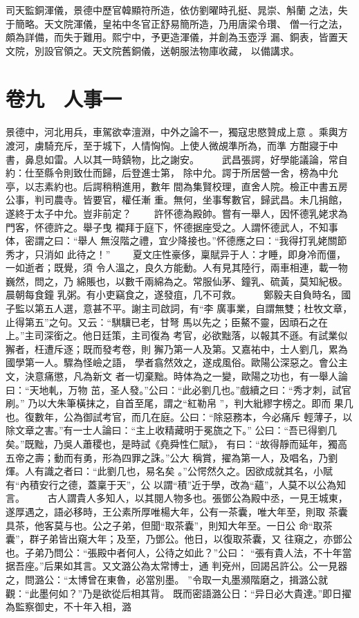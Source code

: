 \documentclass{ctexart}
\begin{document}
司天監銅渾儀，景德中歷官韓顯符所造，依仿劉曜時孔挺、晁崇、斛蘭 之法，失于簡略。天文院渾儀，皇祐中冬官正舒易簡所造，乃用唐梁令瓚、 僧一行之法，頗為詳備，而失于難用。熙宁中，予更造渾儀，并創為玉壺浮 漏、銅表，皆置天文院，別設官領之。天文院舊銅儀，送朝服法物庫收藏， 以備講求。
\clearpage
\section{卷九　人事一}
\paragraph{}
景德中，河北用兵，車駕欲幸澶淵，中外之論不一，獨寇忠愍贊成上意 。乘輿方渡河，虜騎充斥，至于城下，人情恟恟。上使人微覘準所為，而準 方酣寢于中書，鼻息如雷。人以其一時鎮物，比之謝安。 　　武昌張諤，好學能議論，常自約：仕至縣令則致仕而歸，后登進士第， 除中允。諤于所居營一舍，榜為中允亭，以志素約也。后諤稍稍進用，數年 間為集賢校理，直舍人院。檢正中書五房公事，判司農寺。皆要官，權任漸 重。無何，坐事奪數官，歸武昌。未几捐館，遂終于太子中允。豈非前定？ 　　許怀德為殿帥。嘗有一舉人，因怀德乳姥求為門客，怀德許之。舉子曳 襴拜于庭下，怀德据座受之。人謂怀德武人，不知事体，密謂之曰：``舉人 無沒階之禮，宜少降接也。''怀德應之曰：``我得打乳姥關節秀才，只消如 此待之！'' 　　夏文庄性豪侈，稟賦异于人：才睡，即身冷而僵，一如逝者；既覺，須 令人溫之，良久方能動。人有見其陸行，兩車相連，載一物巍然，問之，乃 綿賬也，以數千兩綿為之。常服仙茅、鐘乳、硫黃，莫知紀极。晨朝每食鐘 乳粥。有小吏竊食之，遂發疽，几不可救。 　　鄭毅夫自負時名，國子監以第五人選，意甚不平。謝主司啟詞，有``李 廣事業，自謂無雙；杜牧文章，止得第五''之句。又云：``騏驥已老，甘弩 馬以先之；臣鰲不靈，因頑石之在上。''主司深銜之。他日廷策，主司復為 考官，必欲黜落，以報其不遜。有試業似獬者，枉遭斥逐；既而發考卷，則 獬乃第一人及第。又嘉祐中，士人劉几，累為國學第一人。驟為怪嶮之語， 學者翕然效之，遂成風俗。歐陽公深惡之。會公主文，決意痛懲，凡為新文 者一切棄黜。時体為之一變，歐陽之功也，有一舉人論曰：``天地軋，万物 茁，圣人發。''公曰：``此必劉几也。''戲續之曰：``秀才刺，試官刷。'' 乃以大朱筆橫抹之，自首至尾，謂之``紅勒帛 ''，判大紕繆字榜之。即而 果几也。復數年，公為御試考官，而几在庭。公曰：``除惡務本，今必痛斥 輕薄子，以除文章之害。''有一士人論曰：``主上收精藏明于冕旒之下。'' 公曰：``吾已得劉几矣。''既黜，乃吳人蕭稷也，是時試《堯舜性仁賦》， 有曰：``故得靜而延年，獨高五帝之壽；動而有勇，形為四罪之誅。''公大 稱賞，擢為第一人，及唱名，乃劉煇。人有識之者曰：``此劉几也，易名矣 。''公愕然久之。因欲成就其名，小賦有``內積安行之德，蓋稟于天''，公 以謂``積''近于學，改為``蘊''，人莫不以公為知言。 　　古人謂貴人多知人，以其閱人物多也。張鄧公為殿中丞，一見王城東， 遂厚遇之，語必移時，王公素所厚唯楊大年，公有一茶囊，唯大年至，則取 茶囊具茶，他客莫与也。公之子弟，但聞``取茶囊''，則知大年至。一日公 命``取茶囊''，群子弟皆出窺大年；及至，乃鄧公。他日，以復取茶囊，又 往窺之，亦鄧公也。子弟乃問公：``張殿中者何人，公待之如此？''公曰： ``張有貴人法，不十年當据吾座。''后果如其言。又文潞公為太常博士，通 判兗州，回謁呂許公。公一見器之，問潞公：``太博曾在東魯，必當別墨。 ''令取一丸墨瀕階磨之，揖潞公就觀：``此墨何如？''乃是欲從后相其背。 既而密語潞公日：``异日必大貴達。''即日擢為監察御史，不十年入相，潞 
\end{document}
